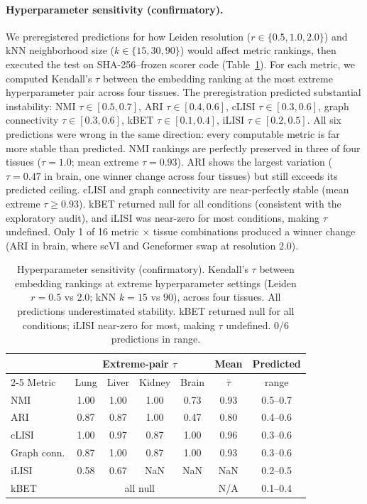\documentclass[10pt,letterpaper]{article}
\begin{document}
\paragraph{Hyperparameter sensitivity (confirmatory).} We preregistered predictions for how Leiden resolution ($r \in \{0.5, 1.0, 2.0\}$) and kNN neighborhood size ($k \in \{15, 30, 90\}$) would affect metric rankings, then executed the test on SHA-256--frozen scorer code (Table~\ref{tab:hyperparam}). For each metric, we computed Kendall's $\tau$ between the embedding ranking at the most extreme hyperparameter pair across four tissues. The preregistration predicted substantial instability: NMI $\tau \in [0.5, 0.7]$, ARI $\tau \in [0.4, 0.6]$, cLISI $\tau \in [0.3, 0.6]$, graph connectivity $\tau \in [0.3, 0.6]$, kBET $\tau \in [0.1, 0.4]$, iLISI $\tau \in [0.2, 0.5]$. All six predictions were wrong in the same direction: every computable metric is far more stable than predicted. NMI rankings are perfectly preserved in three of four tissues ($\tau = 1.0$; mean extreme $\tau = 0.93$). ARI shows the largest variation ($\tau = 0.47$ in brain, one winner change across four tissues) but still exceeds its predicted ceiling. cLISI and graph connectivity are near-perfectly stable (mean extreme $\tau \geq 0.93$). kBET returned null for all conditions (consistent with the exploratory audit), and iLISI was near-zero for most conditions, making $\tau$ undefined. Only 1 of 16 metric $\times$ tissue combinations produced a winner change (ARI in brain, where scVI and Geneformer swap at resolution 2.0).

\begin{table}[t]
\centering
\caption{Hyperparameter sensitivity (confirmatory). Kendall's $\tau$ between embedding rankings at extreme hyperparameter settings (Leiden $r = 0.5$ vs $2.0$; kNN $k = 15$ vs $90$), across four tissues. All predictions underestimated stability. kBET returned null for all conditions; iLISI near-zero for most, making $\tau$ undefined. 0/6 predictions in range.}
\label{tab:hyperparam}
\small
\begin{tabular}{@{}lcccccc@{}}
\toprule
 & \multicolumn{4}{c}{Extreme-pair $\tau$} & Mean & Predicted \\
\cmidrule(lr){2-5}
Metric & Lung & Liver & Kidney & Brain & $\bar{\tau}$ & range \\
\midrule
NMI & 1.00 & 1.00 & 1.00 & 0.73 & 0.93 & 0.5--0.7 \\
ARI & 0.87 & 0.87 & 1.00 & 0.47 & 0.80 & 0.4--0.6 \\
cLISI & 1.00 & 0.97 & 0.87 & 1.00 & 0.96 & 0.3--0.6 \\
Graph conn. & 0.87 & 1.00 & 0.87 & 1.00 & 0.93 & 0.3--0.6 \\
iLISI & 0.58 & 0.67 & NaN & NaN & NaN & 0.2--0.5 \\
kBET & \multicolumn{4}{c}{all null} & N/A & 0.1--0.4 \\
\bottomrule
\end{tabular}
\end{table}
\end{document}
